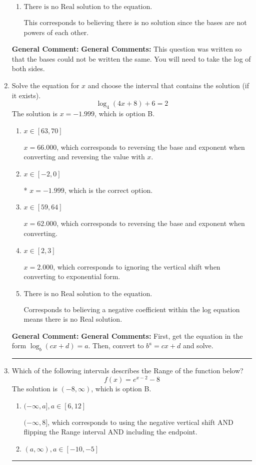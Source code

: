 \documentclass{extbook}[14pt]
\newcommand{\litem}[1]{\item #1

\rule{\textwidth}{0.4pt}}
\begin{document}
\begin{enumerate}
{\begin{enumerate}[label=\Alph*.]
$x = -7.123$, which corresponds to distributing the $\ln(base)$ to the second term of the exponent only.
\item \( \text{There is no Real solution to the equation.} \)

This corresponds to believing there is no solution since the bases are not powers of each other.
\end{enumerate}

\textbf{General Comment:} \textbf{General Comments:} This question was written so that the bases could not be written the same. You will need to take the log of both sides.
}
\litem{
Solve the equation for $x$ and choose the interval that contains the solution (if it exists).
\[ \log_{4}{(4x+8)}+6 = 2 \]
The solution is \( x = -1.999 \), which is option B.\begin{enumerate}[label=\Alph*.]
\item \( x \in [63, 70] \)

$x = 66.000$, which corresponds to reversing the base and exponent when converting and reversing the value with $x$.
\item \( x \in [-2, 0] \)

* $x = -1.999$, which is the correct option.
\item \( x \in [59, 64] \)

$x = 62.000$, which corresponds to reversing the base and exponent when converting.
\item \( x \in [2, 3] \)

$x = 2.000$, which corresponds to ignoring the vertical shift when converting to exponential form.
\item \( \text{There is no Real solution to the equation.} \)

Corresponds to believing a negative coefficient within the log equation means there is no Real solution.
\end{enumerate}

\textbf{General Comment:} \textbf{General Comments:} First, get the equation in the form $\log_b{(cx+d)} = a$. Then, convert to $b^a = cx+d$ and solve.
}
\litem{
Which of the following intervals describes the Range of the function below?
\[ f(x) = e^{x-2}-8 \]
The solution is \( (-8, \infty) \), which is option B.\begin{enumerate}[label=\Alph*.]
\item \( (-\infty, a], a \in [6, 12] \)

$(-\infty, 8]$, which corresponds to using the negative vertical shift AND flipping the Range interval AND including the endpoint.
\item \( (a, \infty), a \in [-10, -5] \)


\end{enumerate}}
\end{enumerate}
\end{document}
